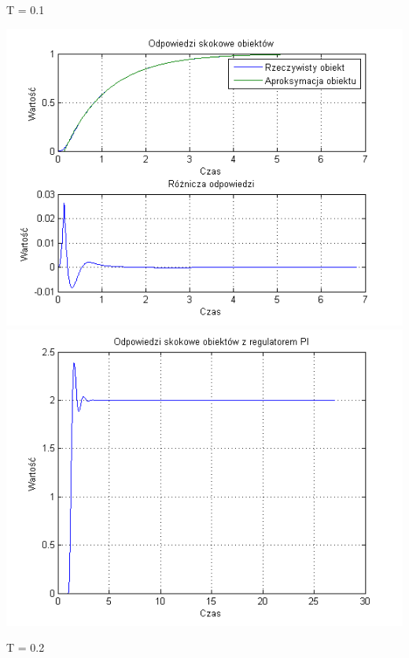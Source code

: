 \documentclass[10pt,a4paper]{article}
\begin{document}
T = 0.1
\begin{center}
\includegraphics[scale=1]{images/jeden/skrypt_247.png}\\
\includegraphics[scale=1]{images/jeden/skrypt_248.png}\\
\end{center}
\newpage
T = 0.2
\end{document}
